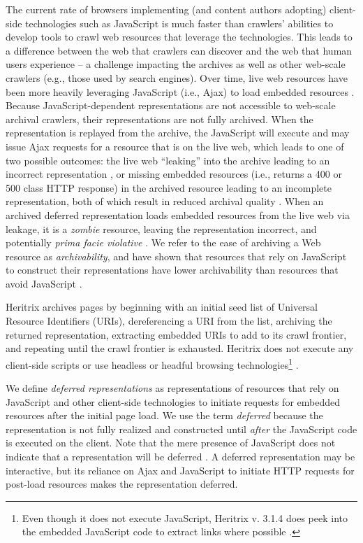 \documentclass{sig-alternate}
\begin{document}
The current rate of browsers implementing (and content authors adopting) client-side technologies such as JavaScript is much faster than crawlers' abilities to develop tools to crawl web resources that leverage the technologies. This leads to a difference between the web that crawlers can discover and the web that human users experience -- a challenge impacting the archives as well as other web-scale crawlers (e.g., those used by search engines). Over time, live web resources have been more heavily leveraging JavaScript (i.e., Ajax) to load embedded resources \cite{ijdl}. Because JavaScript-dependent representations are not accessible to web-scale archival crawlers, their representations are not fully archived. When the representation is replayed from the archive, the JavaScript will execute and may issue Ajax requests for a resource that is  on the live web, which leads to one of two possible outcomes: the live web ``leaking'' into the archive leading to an incorrect representation \cite{zombies}, or missing embedded resources (i.e., returns a 400 or 500 class HTTP response) in the archived resource leading to an incomplete representation, both of which result in reduced archival quality \cite{brunelleDamage}. When an archived deferred representation loads embedded resources from the live web via leakage, it is a \emph{zombie} resource, leaving the representation incorrect, and potentially \emph{prima facie violative} \cite{ainsworthFramework}.
We refer to the ease of archiving a Web resource as \emph{archivability}, and have shown that resources that rely on JavaScript to construct their representations have lower archivability than resources that avoid JavaScript \cite{ijdl}.


Heritrix archives pages by beginning with an initial seed list of Universal Resource Identifiers (URIs), dereferencing a URI from the list, archiving the returned representation, extracting embedded URIs to add to its crawl frontier, and repeating until the crawl frontier is exhausted. Heritrix does not execute any client-side scripts or use headless or headful browsing technologies\footnote{Even though it does not execute JavaScript, Heritrix v. 3.1.4 does peek into the embedded JavaScript code to extract links where possible \cite{htrixJS}.} \cite{googleJS}. 

We define \emph{deferred representations} as representations of resources that rely on JavaScript and other client-side technologies to initiate requests for embedded resources after the initial page load. We use the term \emph{deferred} because the representation is not fully realized and constructed until \emph{after} the JavaScript code is executed on the client. 
Note that the mere presence of JavaScript does not indicate that a representation will be deferred%
. A deferred representation may be interactive, but its reliance on Ajax and JavaScript to initiate HTTP requests for post-load resources makes the representation deferred.
\end{document}

